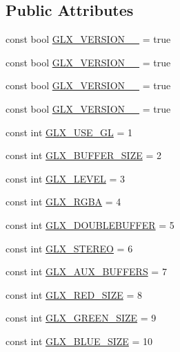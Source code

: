 \subsection*{Public Attributes}
\begin{DoxyCompactItemize}
\item 
const bool \hyperlink{class_tao_1_1_platform_1_1_x11_1_1_glx_a27c592286dce935d5c444c7d961cf901}{GLX\_\-VERSION\_\_} = true
\item 
const bool \hyperlink{class_tao_1_1_platform_1_1_x11_1_1_glx_aa86a895296cc69c0989e87378e7ea4c7}{GLX\_\-VERSION\_\_} = true
\item 
const bool \hyperlink{class_tao_1_1_platform_1_1_x11_1_1_glx_a48ad50734126818cdcb41a659aead31c}{GLX\_\-VERSION\_\_} = true
\item 
const bool \hyperlink{class_tao_1_1_platform_1_1_x11_1_1_glx_a772129eb8346c477e9cdc01efa76e24e}{GLX\_\-VERSION\_\_} = true
\item 
const int \hyperlink{class_tao_1_1_platform_1_1_x11_1_1_glx_aa9b8db15184e106df8fede97d26c1cc6}{GLX\_\-USE\_\-GL} = 1
\item 
const int \hyperlink{class_tao_1_1_platform_1_1_x11_1_1_glx_a1d668eba3b5a2ae6f75cdddbfba5020f}{GLX\_\-BUFFER\_\-SIZE} = 2
\item 
const int \hyperlink{class_tao_1_1_platform_1_1_x11_1_1_glx_a9413f7ed62658e17be5cfec7fa63f08d}{GLX\_\-LEVEL} = 3
\item 
const int \hyperlink{class_tao_1_1_platform_1_1_x11_1_1_glx_ac7d84613555c5152e3ce4f4999a5d8e5}{GLX\_\-RGBA} = 4
\item 
const int \hyperlink{class_tao_1_1_platform_1_1_x11_1_1_glx_a76cfa4610aa8f6c72e50aa96b9d2ba38}{GLX\_\-DOUBLEBUFFER} = 5
\item 
const int \hyperlink{class_tao_1_1_platform_1_1_x11_1_1_glx_a15dffacce94171d23e8941ce8c7128b1}{GLX\_\-STEREO} = 6
\item 
const int \hyperlink{class_tao_1_1_platform_1_1_x11_1_1_glx_a0147fc8ab93b951f8d7f463bac372e0a}{GLX\_\-AUX\_\-BUFFERS} = 7
\item 
const int \hyperlink{class_tao_1_1_platform_1_1_x11_1_1_glx_a033dbf660bd6df8f09dba42972b69a0b}{GLX\_\-RED\_\-SIZE} = 8
\item 
const int \hyperlink{class_tao_1_1_platform_1_1_x11_1_1_glx_a4ea44baa5ca696ca9e15ca33a006f574}{GLX\_\-GREEN\_\-SIZE} = 9
\item 
const int \hyperlink{class_tao_1_1_platform_1_1_x11_1_1_glx_a9dedfd5e84ea2d6e12e45ffb451bf5c4}{GLX\_\-BLUE\_\-SIZE} = 10

\end{DoxyCompactItemize}
